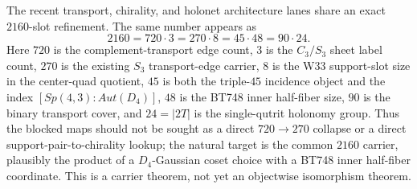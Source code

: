 
\makeatletter
{}
\makeatother
\providecommand{\PSp}{\mathrm{PSp}}
\providecommand{\Aut}{\mathrm{Aut}}
\providecommand{\spec}{\operatorname{spec}}


\begin{proposition}
\label{prop:universal-2160-sheet-carrier}
The recent transport, chirality, and holonet architecture lanes share an exact
$2160$-slot refinement.  The same number appears as
\[
2160
=720\cdot3
=270\cdot8
=45\cdot48
=90\cdot24.
\]
Here $720$ is the complement-transport edge count, $3$ is the $C_3/S_3$ sheet
label count, $270$ is the existing $S_3$ transport-edge carrier, $8$ is the W33
support-slot size in the center-quad quotient, $45$ is both the triple-$45$
incidence object and the index $[Sp(4,3):Aut(D_4)]$, $48$ is the BT748 inner
half-fiber size, $90$ is the binary transport cover, and $24=|2T|$ is the
single-qutrit holonomy group.  Thus the blocked maps should not be sought as a
direct $720\to270$ collapse or a direct support-pair-to-chirality lookup; the
natural target is the common $2160$ carrier, plausibly the product of a
$D_4$-Gaussian coset choice with a BT748 inner half-fiber coordinate.  This is a
carrier theorem, not yet an objectwise isomorphism theorem.
\end{proposition}
